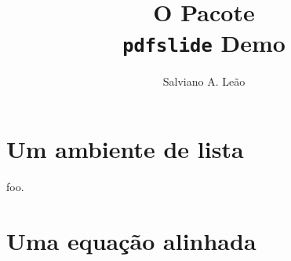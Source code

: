\documentclass{article}
\begin{document}
\title{O Pacote  \\{\normalfont \texttt{pdfslide} Demo}}
\author{Salviano A. Leão \\}
\maketitle

\tableofcontents

\section{Um ambiente de lista}
  

\pause


\stepwise
{%
  \begin{description}
  \item[foo.] 
  \step{\item[baz.]} 
  \end{description}
  }



\section{Uma equação alinhada}

\pause

\end{document}
